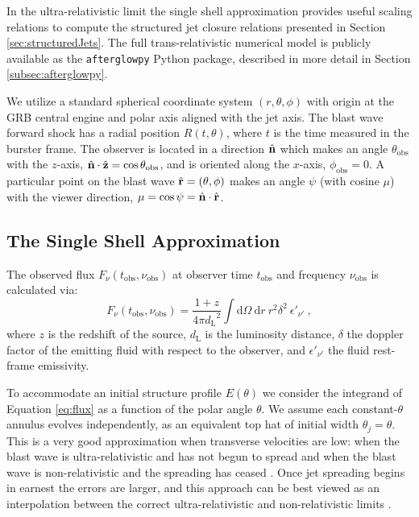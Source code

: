 \documentclass[twocolumn]{aastex62}
\newcommand{\afterglowpy}{{\tt afterglowpy}}
\newcommand{\dd}{\ensuremath{\mathrm{d}}}
\newcommand{\tobs}{\ensuremath{t_{\mathrm{obs}}}}
\newcommand{\nuobs}{\ensuremath{\nu_{\mathrm{obs}}}}
\newcommand{\thobs}{\ensuremath{\theta_{\mathrm{obs}}}}
\newcommand{\phobs}{\ensuremath{\phi_{\mathrm{obs}}}}
\newcommand{\dL}{\ensuremath{d_{\mathrm{L}}}}
\begin{document}
In the ultra-relativistic limit the single shell approximation provides useful scaling relations to compute the structured jet closure relations presented in Section \ref{sec:structuredJets}.  The full trans-relativistic numerical model is publicly available as the \afterglowpy{} Python package, described in more detail in Section \ref{subsec:afterglowpy}.

We utilize a standard spherical coordinate system $(r, \theta, \phi)$ with origin at the GRB central engine and polar axis aligned with the jet axis.  The blast wave forward shock has a radial position $R(t, \theta)$, where $t$ is the time measured in the burster frame. The observer is located in a direction $\hat{\bf n}$ which makes an angle $\thobs$ with the $z$-axis, $\hat{\bf n} \cdot \hat{\bf z} = \cos \thobs$, and is oriented along the $x$-axis, $\phobs = 0$.  A particular point on the blast wave $\hat{\bf r} = (\theta, \phi)$ makes an angle $\psi$ (with cosine $\mu$) with the viewer direction, $\mu = \cos \psi = \hat{\bf n} \cdot \hat{\bf r}$.

\subsection{The Single Shell Approximation}\label{subsec:algo}

The observed flux $F_\nu(\tobs, \nuobs)$ at observer time $\tobs$ and frequency $\nuobs$ is calculated via:
\begin{equation}
	F_\nu(\tobs, \nuobs) = \frac{1+z}{4\pi \dL^2} \int \! \dd \Omega\  \dd r\ r^2 \delta^2\ \epsilon'_{\nu'} \ , \label{eq:flux}
\end{equation}
where $z$ is the redshift of the source, $\dL$ is the luminosity distance, $\delta$ the doppler factor of the emitting fluid with respect to the observer, and $\epsilon'_{\nu'}$ the fluid rest-frame emissivity.

To accommodate an initial structure profile $E(\theta)$ we consider the integrand of Equation \eqref{eq:flux} as a function of the polar angle $\theta$.  We assume each constant-$\theta$ annulus evolves independently, as an equivalent top hat of initial width $\theta_j = \theta$.  This is a very good approximation when transverse velocities are low: when the blast wave is ultra-relativistic and has not begun to spread and when the blast wave is non-relativistic and the spreading has ceased \citep{van-Eerten:2010aa}.  Once jet spreading begins in earnest the errors are larger, and this approach can be best viewed as an interpolation between the correct ultra-relativistic and non-relativistic limits \citep{van-Eerten:2010aa}.
 
\end{document}
